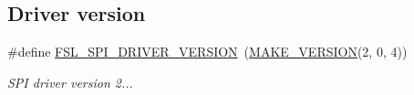 \subsection*{Driver version}
\begin{DoxyCompactItemize}
\item 
\mbox{\label{group__spi__driver_gaeb6046de02dffe9248de71332fac246e}} 
\#define \mbox{\hyperlink{group__spi__driver_gaeb6046de02dffe9248de71332fac246e}{F\+S\+L\+\_\+\+S\+P\+I\+\_\+\+D\+R\+I\+V\+E\+R\+\_\+\+V\+E\+R\+S\+I\+ON}}~(\mbox{\hyperlink{group__ftfx__utilities_ga812138aa3315b0c6953c1a26130bcc37}{M\+A\+K\+E\+\_\+\+V\+E\+R\+S\+I\+ON}}(2, 0, 4))
\begin{DoxyCompactList}\small\item\em S\+PI driver version 2... \end{DoxyCompactList}\end{DoxyCompactItemize}
